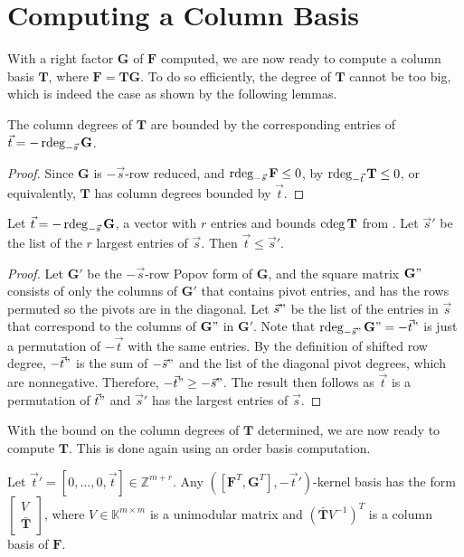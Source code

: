 \section{Computing a Column Basis}

With a right factor $\mathbf{G}$ of $\mathbf{F}$ computed, we are
now ready to compute a column basis $\mathbf{T}$, where $\mathbf{F}=\mathbf{T}\mathbf{G}$.
To do so efficiently, the degree of $\mathbf{T}$ cannot be too big,
which is indeed the case as shown by the following lemmas.
\begin{lem}
\label{lem:colBasisdegreeBoundByRdegOfRightFactor}The column degrees
of $\mathbf{T}$ are bounded by the corresponding entries of $\vec{t}=-\rdeg_{-\vec{s}}\mathbf{G}$.\end{lem}
\begin{proof}
Since $\mathbf{G}$ is $-\vec{s}$-row reduced, and $\rdeg_{-\vec{s}}\mathbf{F}\le0$,
by  $\rdeg_{-\vec{t}}\mathbf{T}\le0$,
or equivalently, $\mathbf{T}$ has column degrees bounded by $\vec{t}$.\end{proof}
\begin{lem}
\label{lem:colBasisDegreeBoundByInputDegrees}Let $\vec{t}=-\rdeg_{-\vec{s}}\mathbf{G}$,
a vector with $r$ entries and bounds $\cdeg\mathbf{T}$ from .
Let $\vec{s}'$ be the list of the $r$ largest entries of $\vec{s}$.
Then $\vec{t}\le\vec{s}'$.\end{lem}
\begin{proof}
Let $\mathbf{G}'$ be the $-\vec{s}$-row Popov form of $\mathbf{G}$,
and the square matrix $\mathbf{G}"$ consists of only the columns
of $\mathbf{G}'$ that contains pivot entries, and has the rows permuted
so the pivots are in the diagonal. Let $\vec{s}"$ be the list of
the entries in $\vec{s}$ that correspond to the columns of $\mathbf{G}"$
in $\mathbf{G}'$. Note that $\rdeg_{-\vec{s}"}\mathbf{G}"=-\vec{t}"$
is just a permutation of $-\vec{t}$ with the same entries. By the
definition of shifted row degree, $-\vec{t}"$ is the sum of $-\vec{s}"$
and the list of the diagonal pivot degrees, which are nonnegative.
Therefore, $-\vec{t}"\ge-\vec{s}"$. The result then follows as $\vec{t}$
is a permutation of $\vec{t}"$ and $\vec{s}'$ has the largest entries
of $\vec{s}$.
\end{proof}
With the bound on the column degrees of $\mathbf{T}$ determined,
we are now ready to compute $\mathbf{T}$. This is done again using
an order basis computation.
\begin{lem}
Let $\vec{t}'=\left[0,\dots,0,\vec{t}\right]\in\mathbb{Z}^{m+r}$.
Any $\left(\left[\mathbf{F}^{T},\mathbf{G}^{T}\right],-\vec{t}'\right)$-kernel
basis has the form $\begin{bmatrix}V\\
\bar{\mathbf{T}}
\end{bmatrix}$, where $V\in\mathbb{K}^{m\times m}$ is a unimodular matrix and $\left(\bar{\mathbf{T}}V^{-1}\right)^{T}$
is a column basis of $\mathbf{F}$.\end{lem}
